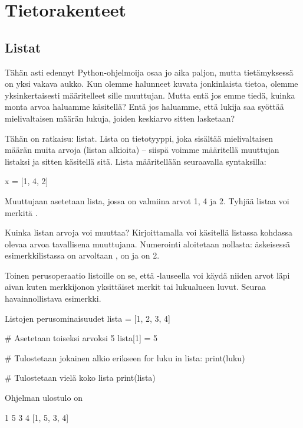 \chapter{Tietorakenteet}

\section{Listat}

Tähän asti edennyt Python-ohjelmoija osaa jo aika paljon, mutta tietämyksessä on yksi vakava aukko. Kun olemme halunneet kuvata jonkinlaista tietoa, olemme yksinkertaisesti määritelleet sille muuttujan. Mutta entä jos emme tiedä, kuinka monta arvoa haluamme käsitellä? Entä jos haluamme, että lukija saa syöttää mielivaltaisen määrän lukuja, joiden keskiarvo sitten lasketaan?

Tähän on ratkaisu: listat. Lista on tietotyyppi, joka sisältää mielivaltaisen määrän muita arvoja (listan alkioita) -- siispä voimme määritellä muuttujan listaksi ja sitten käsitellä sitä. Lista määritellään seuraavalla syntaksilla:

\begin{python}
x = [1, 4, 2]
\end{python}

Muuttujaan  asetetaan lista, jossa on valmiina arvot 1, 4 ja 2. Tyhjää listaa voi merkitä \code{[]}.

Kuinka listan arvoja voi muuttaa? Kirjoittamalla  voi käsitellä listassa  kohdassa  olevaa arvoa tavallisena muuttujana. Numerointi aloitetaan nollasta: äskeisessä esimerkkilistassa  on arvoltaan ,  on  ja  on 2.

Toinen perusoperaatio listoille on se, että -lauseella voi käydä niiden arvot läpi aivan kuten merkkijonon yksittäiset merkit tai lukualueen luvut. Seuraa havainnollistava esimerkki.

\begin{example}{Listojen perusominaisuudet}
lista = [1, 2, 3, 4]

# Asetetaan toiseksi arvoksi 5
lista[1] = 5

# Tulostetaan jokainen alkio erikseen
for luku in lista:
	print(luku)

# Tulostetaan vielä koko lista
print(lista)
\end{example}

Ohjelman ulostulo on

\begin{output}
1
5
3
4
[1, 5, 3, 4]
\end{output}

